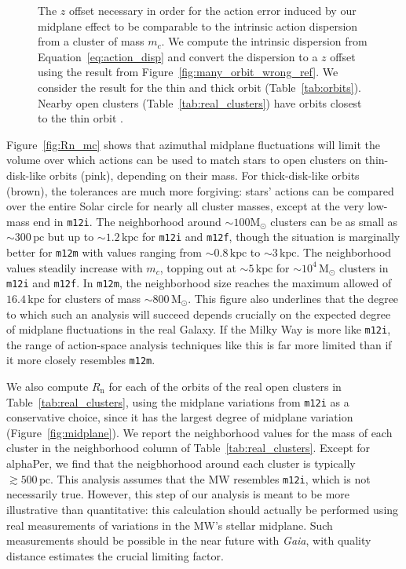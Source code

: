 \documentclass[twocolumn]{aastex62}
\newcommand{\Msun}{\ensuremath{\text{M}_\odot}}
\newcommand{\pc}{\text{pc}}
\newcommand{\kpc}{\text{kpc}}
\newcommand{\mi}{\texttt{m12i}}
\newcommand{\mf}{\texttt{m12f}}
\newcommand{\mm}{\texttt{m12m}}
\newcommand{\n}{\text{n}}
\newcommand{\thincolor}{pink}
\newcommand{\thickcolor}{brown}
\begin{document}
\begin{figure}
\caption{The $z$ offset necessary in order for the action error induced by our
midplane effect to be comparable to the intrinsic action dispersion from a
cluster of mass $m_c$. We compute the intrinsic dispersion from
Equation~\ref{eq:action_disp} and convert the dispersion to a $z$ offset using
the result from Figure~\ref{fig:many_orbit_wrong_ref}. We consider the result
for the thin and thick orbit (Table~\ref{tab:orbits}). Nearby open clusters
(Table~\ref{tab:real_clusters}) have orbits closest to the thin orbit .}
\label{fig:cluster_offset}
\end{figure}

Figure~\ref{fig:Rn_mc} shows that azimuthal midplane fluctuations will limit
the volume over which actions can be used to match stars to open clusters on
thin-disk-like orbits (\thincolor), depending on their mass. For
thick-disk-like orbits (\thickcolor), the tolerances are much more forgiving:
stars' actions can be compared over the entire Solar circle for nearly all
cluster masses, except at the very low-mass end in \mi . The neighborhood
around $\sim100\Msun$ clusters can be as small as $\sim300\,\pc$ but up to
$\sim1.2\,\kpc$ for \mi{} and \mf{}, though the situation is marginally better
for \mm{} with values ranging from $\sim0.8\,\kpc$ to $\sim3\,\kpc$. The
neighborhood values steadily increase with $m_c$, topping out at $\sim5\,\kpc$
for $\sim10^4\,\Msun$ clusters in
\mi{} and \mf{}. In \mm{}, the neighborhood size reaches the maximum allowed of
$16.4\,\kpc$ for clusters of mass $\sim800\,\Msun$. This figure also
underlines that the degree to which such an analysis will succeed depends
crucially on the expected degree of midplane fluctuations in the real Galaxy.
If the Milky Way is more like \mi , the range of action-space analysis
techniques like this is far more limited than if it more closely resembles
\mm{}.

We also compute $R_{\n}$ for each of the orbits of the real open clusters in
Table~\ref{tab:real_clusters}, using the midplane variations from
\mi{} as a conservative choice, since it has the largest degree of
midplane variation (Figure~\ref{fig:midplane}). We report the neighborhood
values for the mass of each cluster in the neighborhood column of
Table~\ref{tab:real_clusters}. Except for alphaPer, we find that the
neigbhorhood around each cluster is typically $\gtrsim 500\,\pc$. This
analysis assumes that the MW resembles \mi{}, which is not necessarily true.
However, this step of our analysis is meant to be more illustrative than
quantitative: this calculation should actually be performed using real
measurements of variations in the MW's stellar midplane. Such measurements
should be possible in the near future with {\em Gaia}, with quality distance
estimates the crucial limiting factor.
\end{document}
